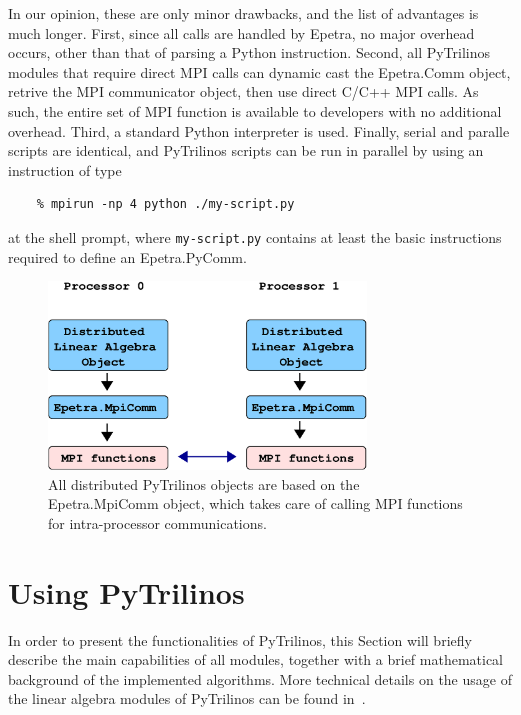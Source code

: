 \documentclass[10pt,relax]{SANDreport}
\begin{document}
In our opinion, these are only minor drawbacks, and the list
of advantages is much longer. 
First, since all
calls are handled by Epetra, no major overhead occurs, other than that of
parsing a Python instruction. Second, all PyTrilinos modules that require
direct MPI calls can dynamic cast the Epetra.Comm object, retrive the MPI
communicator object, then use direct C/C++ MPI calls. As such, the entire set of MPI
function is available to developers with no additional overhead. Third, a standard Python interpreter is
used. Finally, serial and paralle scripts are identical, and 
 PyTrilinos scripts can be run in parallel
by using an instruction of type
\begin{verbatim}
    % mpirun -np 4 python ./my-script.py
\end{verbatim}
at the shell prompt, where {\tt my-script.py} contains at least the basic
instructions required to define an Epetra.PyComm.

\begin{figure}
\begin{center}
\includegraphics[height=5cm]{../UsersGuide/distributed_object.eps}
\caption{All distributed PyTrilinos objects are based on the Epetra.MpiComm
  object, which takes care of calling MPI functions for intra-processor
    communications.}
\label{fig:distributed}
\end{center}
\end{figure}


\section{Using PyTrilinos}
\label{sec:using}

In order to present the functionalities of PyTrilinos, this Section will
briefly describe the main capabilities of all modules, together with a brief
mathematical background of the implemented algorithms. More technical details
on the usage of the linear algebra modules of PyTrilinos can be found
in~\cite{pytrilinos-la-guide}.
\end{document}
